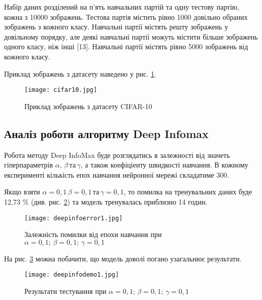 Набір даних розділений на п’ять навчальних партій та одну тестову партію, кожна з 10000 зображень. Тестова партія містить рівно 1000 довільно обраних зображень з кожного класу. Навчальні партії містять решту зображень у довільному порядку, але деякі навчальні партії можуть містити більше зображень одного класу, ніж інші [13]. Навчальні партії містять рівно 5000 зображень від кожного класу.

Приклад зображень з датасету наведено у рис. \ref{fig:cifar10}.

\vspace{1em}

\begin{figure}[h]
  \texttt{[image: cifar10.jpg]}
  \caption{Приклад зображень з датасету CIFAR-10}
  \label{fig:cifar10}
\end{figure}

\subsection{Аналіз роботи алгоритму Deep Infomax}

Робота методу Deep InfoMax буде розглядатись в залежності від значеть гіперпараметрів $\alpha, \, \beta \, \text{та} \, \gamma$, а також коефіціенту швидкості навчання. В кожному експерименті кількість епох навчання нейронної мережі складатиме 300.

Якщо взяти $\alpha = 0,1 \, \beta = 0,1 \, \text{та} \, \gamma = 0,1$, то помилка на тренувальних даних буде 12,73 \% (див. рис. \ref{fig:deepinfoerror1}) та модель тренувалась приблизно 14 годин.

\vspace{1em}

\begin{figure}[h]
  \texttt{[image: deepinfoerror1.jpg]}
  \caption{Залежність помилки від епохи навчання при $\alpha = 0,1; \, \beta = 0,1; \, \gamma = 0,1$}
  \label{fig:deepinfoerror1}
\end{figure}

На рис. \ref{fig:deepinfodemo1} можна побачити, що модель доволі погано узагальнює результати.

\vspace{1em}

\begin{figure}[h]
  \texttt{[image: deepinfodemo1.jpg]}
  \caption{Результати тестування при $\alpha = 0,1; \, \beta = 0,1; \, \gamma = 0,1$}
  \label{fig:deepinfodemo1}
\end{figure}

